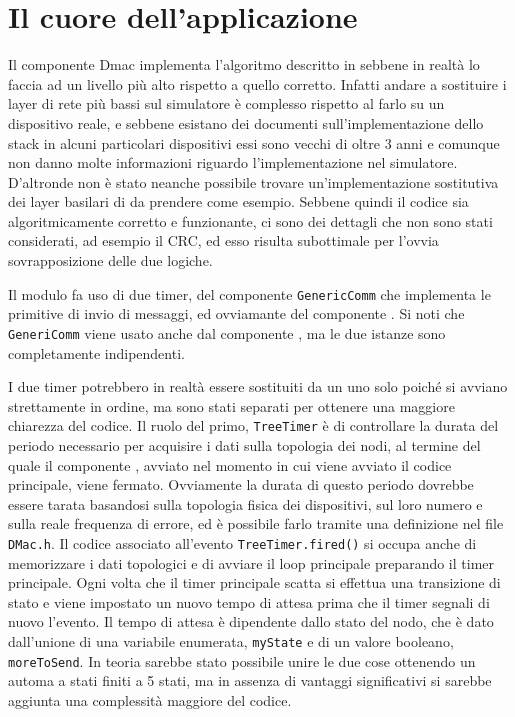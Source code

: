 \documentclass[twoside,11pt,a4paper,italian,openany]{book}
\begin{document}
\section{Il cuore dell'applicazione}
Il componente Dmac implementa l'algoritmo descritto in \cite{DMAC} sebbene in realtà lo faccia 
ad un livello più alto rispetto a quello corretto. Infatti andare a sostituire i layer di rete 
più bassi sul simulatore è complesso rispetto al farlo su un dispositivo reale, 
e sebbene esistano dei documenti sull'implementazione dello stack in alcuni particolari dispositivi\cite{stackpdf} essi sono vecchi di oltre 3 anni e comunque non danno molte informazioni 
riguardo l'implementazione nel simulatore. 
D'altronde non è stato neanche possibile trovare un'implementazione sostitutiva dei layer 
basilari di \tos da prendere come esempio. 
Sebbene quindi il codice sia algoritmicamente corretto e funzionante,
ci sono dei dettagli che non sono stati considerati, ad esempio il CRC, ed esso risulta 
subottimale per l'ovvia sovrapposizione delle due logiche. 

Il modulo fa uso di due timer, del componente \texttt{GenericComm}  che implementa le 
primitive di invio di messaggi, ed ovviamante del componente \tree. 
Si noti che \texttt{GeneriComm} viene usato anche dal componente \tree, ma le due istanze sono completamente indipendenti.  

I due timer potrebbero in realtà essere sostituiti da un uno solo poiché si avviano strettamente in ordine, ma sono stati separati per ottenere una maggiore chiarezza del codice.
Il ruolo del primo, \texttt{TreeTimer} è di controllare la durata del periodo necessario per
acquisire i dati sulla topologia dei nodi, al termine del quale il componente \tree, avviato 
nel momento in cui viene avviato il codice principale, viene fermato.
Ovviamente la durata di questo periodo dovrebbe essere tarata basandosi sulla topologia fisica 
dei dispositivi, sul loro numero e sulla reale frequenza di errore, ed è possibile farlo 
tramite una definizione nel file \texttt{DMac.h}.
Il codice associato all'evento \texttt{TreeTimer.fired()} si occupa anche di memorizzare 
i dati topologici e di avviare il loop principale preparando il timer principale. 
Ogni volta che il timer principale scatta si effettua una transizione di stato e viene 
impostato un nuovo tempo di attesa prima che il timer segnali di nuovo l'evento. 
Il tempo di attesa è dipendente dallo stato del nodo, che è dato dall'unione di una variabile 
enumerata, \texttt{myState} e di un valore booleano, \texttt{moreToSend}. 
In teoria sarebbe stato possibile unire le due cose ottenendo un automa a stati finiti a 
5 stati, ma in assenza di vantaggi significativi si sarebbe aggiunta una complessità maggiore 
del codice. 
\end{document}
